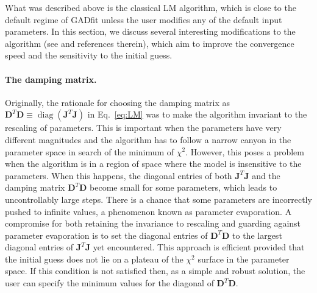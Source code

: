 \documentclass{article}
\DeclareMathOperator{\diag}{diag}
\begin{document}
What was described above is the classical LM algorithm, which is close to the default regime of GADfit unless the user modifies any of the default input parameters. In this section, we discuss several interesting modifications to the algorithm (see \cite{transtrum10, transtrum11, transtrum12} and references therein), which aim to improve the convergence speed and the sensitivity to the initial guess.

\paragraph{The damping matrix.} Originally, the rationale for choosing the damping matrix as $\bm D^T\bm D \equiv \diag(\bm J^T\bm J)$ in Eq.~\eqref{eq:LM} was to make the algorithm invariant to the rescaling of parameters. This is important when the parameters have very different magnitudes and the algorithm has to follow a narrow canyon in the parameter space in search of the minimum of $\chi^2$. However, this poses a problem when the algorithm is in a region of space where the model is insensitive to the parameters. When this happens, the diagonal entries of both $\bm J^T\bm J$ and the damping matrix $\bm D^T\bm D$ become small for some parameters, which leads to uncontrollably large steps. There is a chance that some parameters are incorrectly pushed to infinite values, a phenomenon known as parameter evaporation. A compromise for both retaining the invariance to rescaling and guarding against parameter evaporation is to set the diagonal entries of $\bm D^T\bm D$ to the largest diagonal entries of $\bm J^T\bm J$ yet encountered. This approach is efficient provided that the initial guess does not lie on a plateau of the $\chi^2$ surface in the parameter space. If this condition is not satisfied then, as a simple and robust solution, the user can specify the minimum values for the diagonal of $\bm D^T\bm D$.
\end{document}
